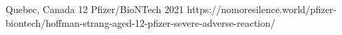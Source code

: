           {Quebec, Canada}
          {12}
          {Pfizer/BioNTech}
          {2021}
          {
          }
          {https://nomoresilence.world/pfizer-biontech/hoffman-strang-aged-12-pfizer-severe-adverse-reaction/}

